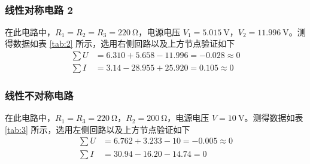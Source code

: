 \documentclass[a4paper,utf8]{article}
\begin{document}
\begin{table}[!ht]
{\begin{tabular}{cc}
        \end{tabular}
    } \\[1em]
    \hfil
\end{table}

\subsubsection{线性对称电路 2}
在此电路中，$R_1=R_2=R_3=\SI{220}{\ohm}$，电源电压 $V_1=\SI{5.015}{\V}$，$V_2=\SI{11.996}{\V}$。测得数据如表 \ref{tab:2} 所示，选用右侧回路以及上方节点验证如下
\begin{align*}
    \sum U&= 6.310+5.658-11.996=-0.028\approx 0\\
    \sum I&= 3.14-28.955+25.920=0.105\approx 0
\end{align*}

\subsubsection{线性不对称电路}
在此电路中，$R_1=R_3=\SI{220}{\ohm}$，$R_2=\SI{200}{\ohm}$，电源电压 $V=\SI{10}{\V}$。测得数据如表 \ref{tab:3} 所示，选用左侧回路以及上方节点验证如下
\begin{align*}
    \sum U&= 6.762+3.233-10=-0.005\approx 0\\
    \sum I&= 30.94-16.20-14.74=0
\end{align*}
\end{document}

